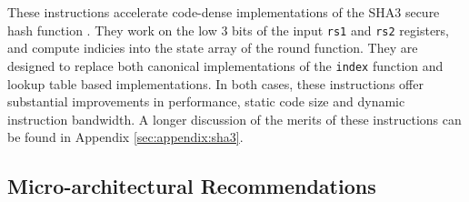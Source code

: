 These instructions accelerate code-dense implementations of the SHA3 secure
hash function \cite{nist:fips:202}.
They work on the low $3$ bits of the input {\tt rs1} and {\tt rs2} registers,
and compute indicies into the state array of the round function.
They are designed to replace both canonical implementations of the
{\tt index} function and lookup table based implementations.
In both cases, these instructions offer substantial
improvements in performance, static code size and dynamic instruction
bandwidth.
A longer discussion of the merits of these instructions can
be found in Appendix \ref{sec:appendix:sha3}.


\subsection{Micro-architectural Recommendations}



